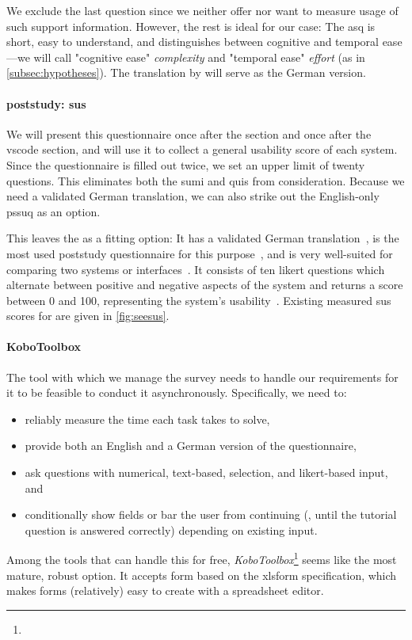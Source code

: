 \documentclass[../thesis]{subfiles}
\begin{document}
We exclude the last question since we neither offer nor want to measure usage of such support information.
However, the rest is ideal for our case:
The \gls{asq} is short, easy to understand, and distinguishes between cognitive and temporal ease---we will call "cognitive ease" \emph{complexity} and "temporal ease" \emph{effort} (as in \cref{subsec:hypotheses}).
The translation by \textcite[32]{roegele2020} will serve as the German version.

\paragraph{\Gls{poststudy}: \gls{sus}}
We will present this questionnaire once after the \SEE{} section and once after the \gls{vscode} section, and will use it to collect a general usability score of each system.
Since the questionnaire is filled out twice, we set an upper limit of twenty questions.
This eliminates both the \gls{sumi} and \gls{quis} from consideration.
Because we need a validated German translation, we can also strike out the English-only \gls{pssuq} as an option.

This leaves the \emph{} as a fitting option:
It has a validated German translation~\cite{reinhardt2015}, is the most used \gls{poststudy} questionnaire for this purpose~\cites[1615]{sauro2009}[577]{lewis2018}, and is very well-suited for comparing two systems or interfaces~\cites[195]{peres2013}[590--591]{bangor2008}.
It consists of ten \gls{likert} questions which alternate between positive and negative aspects of the system and returns a score between 0 and 100, representing the system's usability~\cite{brooke1996}.
Existing measured \gls{sus} scores for \SEE{} are given in \cref{fig:seesus}.

\paragraph{KoboToolbox}
The tool with which we manage the survey needs to handle our requirements for it to be feasible to conduct it asynchronously.
Specifically, we need to:
\begin{itemize}
	\item reliably measure the time each task takes to solve,
	\item provide both an English and a German version of the questionnaire,
	\item ask questions with numerical, text-based, selection, and \gls{likert}-based input, and
	\item conditionally show fields or bar the user from continuing (\eg, until the tutorial question is answered correctly) depending on existing input.
\end{itemize}
Among the tools that can handle this for free, \textit{KoboToolbox}\footnote{
} seems like the most mature, robust option.
It accepts form based on the \gls{xlsform} specification, which makes forms (relatively) easy to create with a spreadsheet editor.
\end{document}
